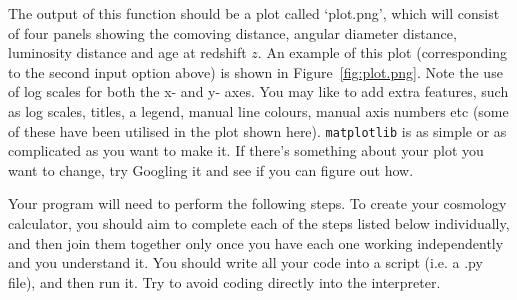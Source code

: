 \documentclass[]{article}
\begin{document}
\begin{figure*}[t!]
\caption{An example output for \texttt{cosmo.py}. The purple line is the user specified input, and is based on the second example input shown above.}
\label{fig:plot.png}
\end{figure*}

\noindent The output of this function should be a plot called `plot.png', which will consist of four panels showing the comoving distance, angular diameter distance, luminosity distance and age at redshift $z$. An example of this plot (corresponding to the second input option above) is shown in Figure~\ref{fig:plot.png}. Note the use of log scales for both the x- and y- axes. You may like to add extra features, such as log scales, titles, a legend, manual line colours, manual axis numbers etc (some of these have been utilised in the plot shown here). \texttt{matplotlib} is as simple or as complicated as you want to make it. If there's something about your plot you want to change, try Googling it and see if you can figure out how. \\


\noindent Your program will need to perform the following steps. To create your cosmology calculator, you should aim to complete each of the steps listed below individually, and then join them together only once you have each one working independently and you understand it. You should write all your code into a script (i.e. a .py file), and then run it. Try to avoid coding directly into the interpreter. 
\end{document}
